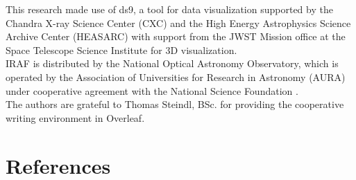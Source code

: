 \documentclass{article}
\begin{document}
This research made use of ds9, a tool for data visualization supported by the Chandra X-ray Science Center (CXC) and the High Energy Astrophysics Science Archive Center (HEASARC) with support from the JWST Mission office at the Space Telescope Science Institute for 3D visualization\parencite{2003ASPC..295..489J}.\\
IRAF is distributed by the National Optical Astronomy Observatory, which is operated by the Association of Universities for Research in Astronomy (AURA) under cooperative agreement with the National Science Foundation \parencite{1993ASPC...52..173T}. \\
The authors are grateful to Thomas Steindl, BSc. for providing the cooperative writing environment in Overleaf. %

\newpage
\section{References}
\printbibliography[heading=none] %

\newpage

\appendix
\end{document}
